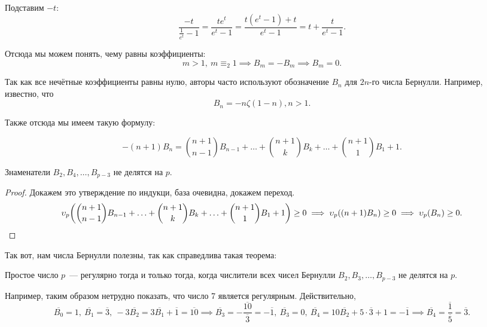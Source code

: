  		 Подставим $-t$:
 		 \[
 		 	\frac{-t}{\frac{1}{e^{t}} - 1} = \frac{t e^{t}}{e^{t} - 1} = \frac{t(e^t - 1) + t}{e^t - 1} = t + \frac{t}{e^t - 1}.
 		 \]

 		 Отсюда мы можем понять, чему равны коэффициенты: 
 		 \[
 		 	m > 1, \ m \equiv_{2} 1 \implies B_m = -B_m \implies B_m = 0.
 		 \]
 		 \begin{remark}
 		 	Так как все нечётные коэффициенты равны нулю, авторы часто используют обозначение $B_n$ для $2n$-го числа Бернулли. Например, известно, что 
 		 \[
 		 	B_{n} = -n \zeta(1 - n), n > 1.
 		 \]
 		 \end{remark}
 		 Также отсюда мы имеем такую формулу: 
 		 \begin{statement} 
 		 	\[
 		 	-(n + 1)B_n = \binom{n + 1}{n - 1} B_{n - 1} + \ldots + \binom{n + 1}{k}B_{k} + \ldots + \binom{n + 1}{1} B_{1} + 1. 
 		 \]	
 		 \end{statement}
 		 \begin{corollary}
 		 	Знаменатели $B_{2}, B_{4}, \ldots, B_{p - 3}$ не делятся на $p$.
 		 \end{corollary}
 		 \begin{proof}
 		 	Докажем это утверждение по индукци, база очевидна, докажем переход. 
 		 	\[
 		 		\v_{p}\lr*{\binom{n + 1}{n - 1} B_{n - 1} + \ldots + \binom{n + 1}{k}B_{k} + \ldots + \binom{n + 1}{1} B_{1} + 1} \ge 0 \implies \v_{p}((n + 1)B_{n}) \ge 0 \implies \v_{p}(B_n) \ge 0.
 		 	\]
 		 \end{proof}

 		 Так вот, нам числа Бернулли полезны, так как справедлива такая теорема:
 		 \begin{theorem} 
 		 	Простое число $p$~--- регулярно тогда и только тогда, когда числители всех чисел Бернулли $B_{2}, B_{3}, \ldots, B_{p - 3}$ не делятся на $p$.
 		 \end{theorem}
 		 

 		 \begin{example}
 		 	Например, таким образом нетрудно показать, что число 7 является регулярным. Действительно, 
 		 	\[
 		 		\overline{B_0} = 1, \ \overline{B_1} = \overline{3}, \ -3\overline{B_2} = 3 \overline{B_1} + \overline{1} = \overline{10} \implies \overline{B_3} = -\frac{\overline{10}}{\overline{3}} = -\overline{1}, \ \overline{B_3} = 0, \ \overline{B_4} = 10\overline{B_2} + 5 \cdot \overline{3} + 1 = -\overline{1} \implies \overline{B_4} = \frac{\overline{1}}{\overline{5}} = \overline{3}. 
 		 	\]
 		 \end{example}

